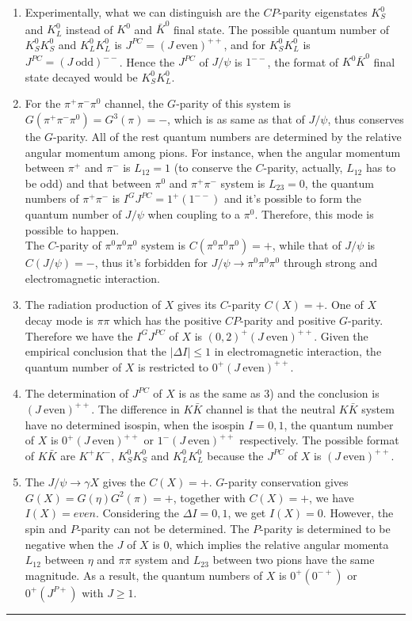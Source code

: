 \documentclass[12pt,twoside]{report}
\newcommand{\pip}{\pi^+}
\newcommand{\piz}{\pi^0}
\newcommand{\pim}{\pi^-}
\newcommand{\kap}{K^+}
\newcommand{\kam}{K^-}
\numberwithin{problemname}{chapter}
\newenvironment{solution}{\vspace{1em}\par\noindent{\large\textbf{\textsc{Solution}}}\par}{\vspace{1em}\hrule}
\begin{document}
\begin{solution}
\begin{enumerate}[1)]
    \item Experimentally, what we can distinguish are the $CP$-parity eigenstates $K_S^0$ and $K_L^0$ instead of $K^0$ and $\bar{K}^0$ final state. The possible quantum number of $K_S^0K_S^0$ and $K_L^0K_L^0$ is $J^{PC}=(J~\mathrm{even})^{++}$, and for $K_S^0K_L^0$ is $J^{PC}=(J~\mathrm{odd})^{--}$. Hence the $J^{PC}$ of $J/\psi$ is $1^{--}$, the format of $K^0\bar{K}^0$ final state decayed would be $K_S^0K_L^0$.
    \item For the $\pip\pim\piz$ channel, the $G$-parity of this system is $G(\pip\pim\piz)=G^3(\pi)=-$, which is as same as that of $J/\psi$, thus conserves the $G$-parity. All of the rest quantum numbers are determined by the relative angular momentum among pions. For instance, when the angular momentum between $\pip$ and $\pim$ is $L_{12}=1$ (to conserve the $C$-parity, actually, $L_{12}$ has to be odd) and that between $\piz$ and $\pip\pim$ system is $L_{23}=0$, the quantum numbers of $\pip\pim$ is $I^GJ^{PC}=1^+(1^{--})$ and it's possible to form the quantum number of $J/\psi$ when coupling to a $\piz$. Therefore, this mode is possible to happen.\\
    The $C$-parity of $\piz\piz\piz$ system is $C(\piz\piz\piz)=+$, while that of $J/\psi$ is $C(J/\psi)=-$, thus it's forbidden for $J/\psi\to \piz\piz\piz$ through strong and electromagnetic interaction.
    \item The radiation production of $X$ gives its $C$-parity $C(X)=+$. One of $X$ decay mode is $\pi\pi$ which has the positive $CP$-parity and positive $G$-parity. Therefore we have the $I^GJ^{PC}$ of $X$ is $(0,2)^+(J~\mathrm{even})^{++}$. Given the empirical conclusion that the $|\Delta I|\leq 1$ in electromagnetic interaction, the quantum number of $X$ is restricted to $0^+(J~\mathrm{even})^{++}$.
    \item The determination of $J^{PC}$ of $X$ is as the same as 3) and the conclusion is $(J~\mathrm{even})^{++}$. The difference in $K\bar{K}$ channel is that the neutral $K\bar{K}$ system have no determined isospin, when the isospin $I=0,1$, the quantum number of $X$ is $0^{+}(J~\mathrm{even})^{++}$ or $1^{-}(J~\mathrm{even})^{++}$ respectively. The possible format of $K\bar{K}$ are $\kap\kam$, $K_S^0K_S^0$ and $K_L^0K_L^0$ because the $J^{PC}$ of $X$ is $(J~\mathrm{even})^{++}$.
    \item The $J/\psi\to\gamma X$ gives the $C(X)=+$. $G$-parity conservation gives $G(X)=G(\eta)G^2(\pi)=+$, together with $C(X)=+$, we have $I(X)=even$. Considering the $\Delta I=0,1$, we get $I(X)=0$. However, the spin and $P$-parity can not be determined. The $P$-parity is determined to be negative when the $J$ of $X$ is $0$, which implies the relative angular momenta $L_{12}$ between $\eta$ and $\pi\pi$ system and $L_{23}$ between two pions have the same magnitude. As a result, the quantum numbers of $X$ is $0^+(0^{-+})$ or $0^+(J^{P+})$ with $J\geq 1$.
\end{enumerate}
\end{solution}
\end{document}
